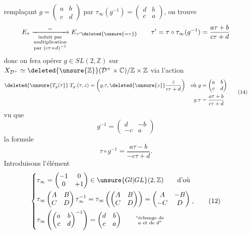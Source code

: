 remplaçant $g=\begin{pmatrix}a&b\\c&d\end{pmatrix}$ par $\tau_\infty(g^{-1})=\begin{pmatrix}d&b\\c&a\end{pmatrix}$, on trouve
\[
E_\tau\xrightarrow[\substack{\text{induit par}\\\text{multiplication}\\\text{par }(c\tau+d)^{-1}}]{\sim}E_{\tau'\deleted{\unsure{=\tau}}}
\qquad \tau'=\tau\circ\tau_\infty(g^{-1})=\frac{a\tau+b}{c\tau+d}
\]
donc on fera opérer $g\in SL(2,\mathbb Z)$  sur $X_{\mathcal D^+}\simeq\deleted{\unsure{\mathbb Z}}(\mathcal D^+\times\mathbb C)/\mathbb Z\times\mathbb Z$ via l'action
\[
\begin{aligned}
\deleted{\unsure{T_g(\tau}}\;T_g.(\tau,z)&=\left(g.\tau,\deleted{\unsure{z}}\frac{z}{c\tau+d}\right)
&\text{où }g&=\begin{pmatrix}a&b\\c&d\end{pmatrix}\\
&&g.\tau&=\frac{a\tau+b}{c\tau+d}
\end{aligned}\tag*{(14)}
\]
vu que
\[
g^{-1}=\begin{pmatrix}d&-b\\-c&a\end{pmatrix}
\]
la formule
\[
\tau\circ g^{-1}=\frac{a\tau-b}{-c\tau+d}. \tag*{(11)}
\]
Introduisons l'élément
\[
\left\{\begin{aligned}
&\tau_\infty=\begin{pmatrix}-1&0\\0&+1\end{pmatrix}\in\unsure{Gl|GL}(2,\mathbb Z)\qquad\text{d'où}\\
&\tau_\infty\begin{pmatrix}A&B\\C&D\end{pmatrix}\tau_\infty^{-1}
=\tau_\infty\left(\begin{pmatrix}A&B\\C&D\end{pmatrix}\right)
=\begin{pmatrix}A&-B\\-C&D\end{pmatrix}\\
&\tau_\infty\left(\begin{pmatrix}a&b\\c&d\end{pmatrix}^{-1}\right)
=\begin{pmatrix}d&b\\c&a\end{pmatrix}\qquad\substack{\text{``échange de}\\\text{$a$ et de $d$''}}
\end{aligned}\right.,\tag*{(12)}
\]
